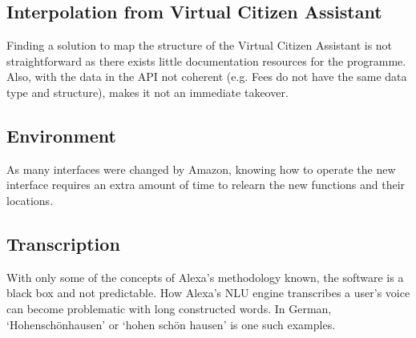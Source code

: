 \subsection*{Interpolation from Virtual Citizen Assistant}
Finding a solution to map the structure of the Virtual Citizen Assistant is not straightforward as there exists little documentation resources for the programme.
Also, with the data in the API not coherent (e.g. Fees do not have the same data type and structure), makes it not an immediate takeover.

\subsection*{Environment}
As many interfaces were changed by Amazon, knowing how to operate the new interface requires an extra amount of time to relearn the new functions and their locations.

\subsection*{Transcription}
With only some of the concepts of Alexa's methodology known, the software is a black box and not predictable. How Alexa's NLU engine transcribes a user's voice can become problematic with long constructed words. In German, `Hohenschönhausen' or `hohen schön hausen' is one such examples.



%

